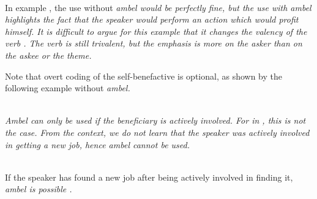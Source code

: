  \\
In example , the use without \em ambel \em would be perfectly fine, but the use with \em ambel \em highlights the fact that the speaker would perform an action which would profit himself. It is difficult to argue for this example that it changes the valency of the verb . The verb is still trivalent, but the emphasis is more on the asker than on the askee or the theme.

Note that overt coding of the self-benefactive is optional, as shown by the following example without \em ambel\em.


 \\

%
%
%
\em Ambel \em can only be used if the beneficiary is actively involved. For  in , this is not the case. From the context, we do not learn that the speaker was actively involved in getting a new job, hence \em ambel \em cannot be used.

 \\
If the speaker has found a new job after being actively involved in finding it, \em ambel \em is possible .


